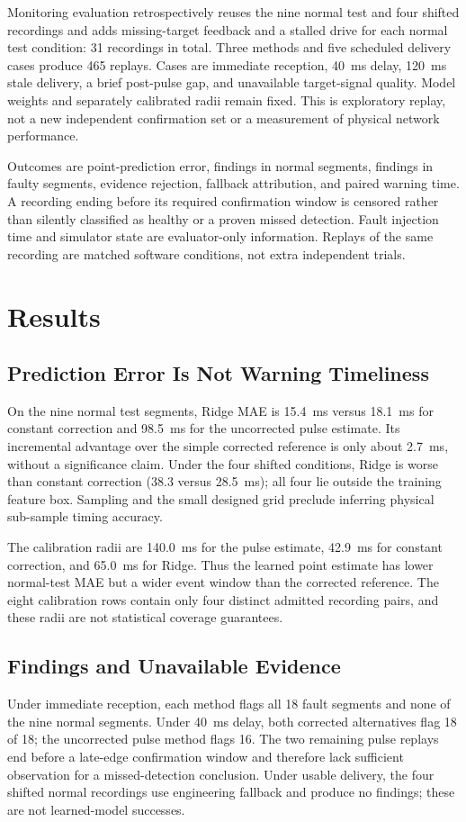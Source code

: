 Monitoring evaluation retrospectively reuses the nine normal test and four shifted recordings and adds missing-target feedback and a stalled drive for each normal test condition: 31 recordings in total. Three methods and five scheduled delivery cases produce 465 replays. Cases are immediate reception, 40~ms delay, 120~ms stale delivery, a brief post-pulse gap, and unavailable target-signal quality. Model weights and separately calibrated radii remain fixed. This is exploratory replay, not a new independent confirmation set or a measurement of physical network performance.

Outcomes are point-prediction error, findings in normal segments, findings in faulty segments, evidence rejection, fallback attribution, and paired warning time. A recording ending before its required confirmation window is censored rather than silently classified as healthy or a proven missed detection. Fault injection time and simulator state are evaluator-only information. Replays of the same recording are matched software conditions, not extra independent trials.

\section{Results}
\subsection{Prediction Error Is Not Warning Timeliness}

On the nine normal test segments, Ridge MAE is 15.4~ms versus 18.1~ms for constant correction and 98.5~ms for the uncorrected pulse estimate. Its incremental advantage over the simple corrected reference is only about 2.7~ms, without a significance claim. Under the four shifted conditions, Ridge is worse than constant correction (38.3 versus 28.5~ms); all four lie outside the training feature box. Sampling and the small designed grid preclude inferring physical sub-sample timing accuracy.

The calibration radii are 140.0~ms for the pulse estimate, 42.9~ms for constant correction, and 65.0~ms for Ridge. Thus the learned point estimate has lower normal-test MAE but a wider event window than the corrected reference. The eight calibration rows contain only four distinct admitted recording pairs, and these radii are not statistical coverage guarantees.

\subsection{Findings and Unavailable Evidence}

Under immediate reception, each method flags all 18 fault segments and none of the nine normal segments. Under 40~ms delay, both corrected alternatives flag 18 of 18; the uncorrected pulse method flags 16. The two remaining pulse replays end before a late-edge confirmation window and therefore lack sufficient observation for a missed-detection conclusion. Under usable delivery, the four shifted normal recordings use engineering fallback and produce no findings; these are not learned-model successes.

